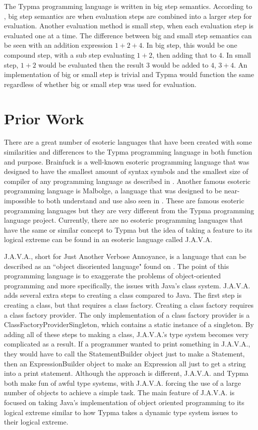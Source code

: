 \documentclass[10pt,twocolumn]{article}
\begin{document}
The Typma programming language is written in big step semantics. According to \textcite{CS4110IMP}, big step semantics are when evaluation steps are combined into a larger step for evaluation. Another evaluation method is small step, when each evaluation step is evaluated one at a time. The difference between big and small step semantics can be seen with an addition expression $1 + 2 + 4$. In big step, this would be one compound step, with a sub step evaluating $1+ 2$, then adding that to $4$. In small step, $1 + 2$ would be evaluated then the result $3$ would be added to $4$, $3 + 4$. An implementation of big or small step is trivial and Typma would function the same regardless of whether big or small step was used for evaluation.

\section{Prior Work}

There are a great number of esoteric languages that have been created with some similarities and differences to the Typma programming language in both function and purpose. Brainfuck is a well-known esoteric programming language that was designed to have the smallest amount of syntax symbols and the smallest size of compiler of any programming language as described in \textcite{Morr2014Esoteric}. Another famous esoteric programming language is Malbolge, a language that was designed to be near-impossible to both understand and use also seen in \textcite{Morr2014Esoteric}. These are famous esoteric programming languages but they are very different from the Typma programming language project. Currently, there are no esoteric programming languages that have the same or similar concept to Typma but the idea of taking a feature to its logical extreme can be found in an esoteric language called J.A.V.A. 

J.A.V.A., short for Just Another Verbose Annoyance, is a language that can be described as an ``object disoriented language" found on \textcite{J.A.V.A.}. The point of this programming language is to exaggerate the problems of object-oriented programming and more specifically, the issues with Java's class system. J.A.V.A. adds several extra steps to creating a class compared to Java. The first step is creating a class, but that requires a class factory. Creating a class factory requires a class factory provider. The only implementation of a class factory provider is a ClassFactoryProviderSingleton, which contains a static instance of a singleton. By adding all of these steps to making a class, J.A.V.A.'s type system becomes very complicated as a result. If a programmer wanted to print something in J.A.V.A., they would have to call the StatementBuilder object just to make a Statement, then an ExpressionBuilder object to make an Expression all just to get a string into a print statement. Although the approach is different, J.A.V.A. and Typma both make fun of awful type systems, with J.A.V.A. forcing the use of a large number of objects to achieve a simple task. The main feature of J.A.V.A. is focused on taking Java's implementation of object oriented programming to its logical extreme similar to how Typma takes a dynamic type system issues to their logical extreme.
\end{document}

